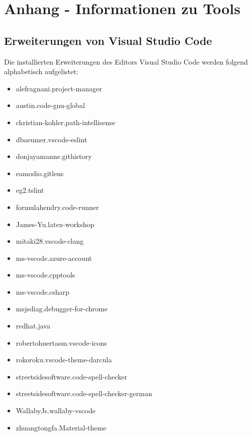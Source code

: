 \chapter{Anhang - Informationen zu Tools}
\label{cha:Anhang_Info}

\section{Erweiterungen von Visual Studio Code}
\label{sec:extensions}
Die installierten Erweiterungen des Editors Visual Studio Code werden folgend alphabetisch aufgelistet: 
\begin{multicols}{2}
	\begin{itemize}
		\item alefragnani.project-manager
		\item austin.code-gnu-global
		\item christian-kohler.path-intellisense
		\item dbaeumer.vscode-eslint
		\item donjayamanne.githistory
		\item eamodio.gitlens
		\item eg2.tslint
		\item formulahendry.code-runner
		\item James-Yu.latex-workshop
		\item mitaki28.vscode-clang	
	\end{itemize}
	\columnbreak
	\begin{itemize}
		\item ms-vscode.azure-account
		\item ms-vscode.cpptools
		\item ms-vscode.csharp
		\item msjsdiag.debugger-for-chrome
		\item redhat.java
		\item robertohuertasm.vscode-icons
		\item rokoroku.vscode-theme-darcula
		\item streetsidesoftware.code-spell-checker
		\item streetsidesoftware.code-spell-checker-german
		\item WallabyJs.wallaby-vscode
		\item zhuangtongfa.Material-theme
	\end{itemize}
\end{multicols}